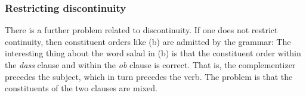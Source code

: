 \subsubsection{Restricting discontinuity}
\label{sec-restricting-discont}

There is a further problem related to discontinuity. If one does not restrict continuity, then
constituent orders like (b) are admitted by the grammar:
\eal
{}
\zl
The interesting thing about the word salad in (b) is that the constituent order within the
\emph{dass} clause and within the \emph{ob} clause is correct. That is, the complementizer precedes
the subject, which in turn precedes the verb. The problem is that the constituents of the two
clauses are mixed. 

